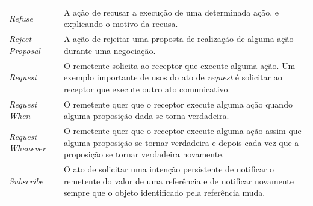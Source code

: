 \begin{table}
{\begin{tabular}{ l l }
  \cline{1-1}\cline{2-2}  
    \multicolumn{1}{|p{2.750cm}|}{\textit{Refuse}} &
    \multicolumn{1}{p{11.700cm}|}{A ação de recusar a execução de uma determinada ação, e explicando o motivo da recusa.}
  \\  
  \cline{1-1}\cline{2-2}  
    \multicolumn{1}{|p{2.750cm}|}{\textit{Reject Proposal}} &
    \multicolumn{1}{p{11.700cm}|}{A ação de rejeitar uma proposta de realização de alguma ação durante uma negociação.}
  \\  
  \cline{1-1}\cline{2-2}  
    \multicolumn{1}{|p{2.750cm}|}{\textit{Request}} &
    \multicolumn{1}{p{11.700cm}|}{O remetente solicita ao receptor que execute alguma ação. Um exemplo importante de usos do ato de \textit{request} é solicitar ao receptor que execute outro ato comunicativo.}
  \\  
  \cline{1-1}\cline{2-2}  
    \multicolumn{1}{|p{2.750cm}|}{\textit{Request When}} &
    \multicolumn{1}{p{11.700cm}|}{O remetente quer que o receptor execute alguma ação quando alguma proposição dada se torna verdadeira.}
  \\  
  \cline{1-1}\cline{2-2}  
    \multicolumn{1}{|p{2.750cm}|}{\textit{Request Whenever}} &
    \multicolumn{1}{p{11.700cm}|}{O remetente quer que o receptor execute alguma ação assim que alguma proposição se tornar verdadeira e depois cada vez que a proposição se tornar verdadeira novamente.}
  \\  
  \cline{1-1}\cline{2-2}  
    \multicolumn{1}{|p{2.750cm}|}{\textit{Subscribe}} &
    \multicolumn{1}{p{11.700cm}|}{O ato de solicitar uma intenção persistente de notificar o remetente do valor de uma referência e de notificar novamente sempre que o objeto identificado pela referência muda.}
  \\  
  \hline

 \end{tabular} }
\end{table}
